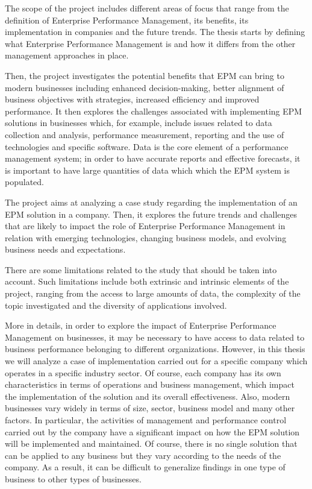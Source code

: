 \documentclass[12pt,a4paper,openright,twoside]{book}
\begin{document}
The scope of the project includes different areas of focus that range from the definition of Enterprise Performance Management, its benefits, its implementation in companies and the future trends.
%
The thesis starts by defining what Enterprise Performance Management is and how it differs from the other management approaches in place.

Then, the project investigates the potential benefits that EPM can bring to modern businesses including enhanced decision-making, better alignment of business objectives with strategies, increased efficiency and improved performance.
%
It then explores the challenges associated with implementing EPM solutions in businesses which, for example, include issues related to data collection and analysis, performance measurement, reporting and the use of technologies and specific software.
%
Data is the core element of a performance management system; in order to have accurate reports and effective forecasts, it is important to have large quantities of data which which the EPM system is populated. 

The project aims at analyzing a case study regarding the implementation of an EPM solution in a company.
%
Then, it explores the future trends and challenges that are likely to impact the role of Enterprise Performance Management in relation with emerging technologies, changing business models, and evolving business needs and expectations.

There are some limitations related to the study that should be taken into account.
%
Such limitations include both extrinsic and intrinsic elements of the project, ranging from the access to large amounts of data, the complexity of the topic investigated and the diversity of applications involved.

More in details, in order to explore the impact of Enterprise Performance Management on businesses, it may be necessary to have access to data related to business performance belonging to different organizations.
%
However, in this thesis we will analyze a case of implementation carried out for a specific company which operates in a specific industry sector. 
%
Of course, each company has its own characteristics in terms of operations and business management, which impact the implementation of the solution and its overall effectiveness.
%
Also, modern businesses vary widely in terms of size, sector, business model and many other factors.
%
In particular, the activities of management and performance control carried out by the company have a significant impact on how the EPM solution will be implemented and maintained.
%
Of course, there is no single solution that can be applied to any business but they vary according to the needs of the company.
%
As a result, it can be difficult to generalize findings in one type of business to other types of businesses.
\end{document}
